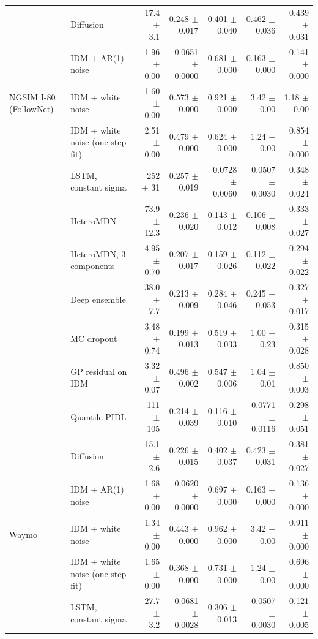\begin{longtable}{llrrrrr}
 & Diffusion & 17.4 $\pm$ 3.1 & 0.248 $\pm$ 0.017 & 0.401 $\pm$ 0.040 & 0.462 $\pm$ 0.036 & 0.439 $\pm$ 0.031 \\
 & IDM + AR(1) noise & 1.96 $\pm$ 0.00 & 0.0651 $\pm$ 0.0000 & 0.681 $\pm$ 0.000 & 0.163 $\pm$ 0.000 & 0.141 $\pm$ 0.000 \\
\midrule
NGSIM I-80 (FollowNet) & IDM + white noise & 1.60 $\pm$ 0.00 & 0.573 $\pm$ 0.000 & 0.921 $\pm$ 0.000 & 3.42 $\pm$ 0.00 & 1.18 $\pm$ 0.00 \\
 & IDM + white noise (one-step fit) & 2.51 $\pm$ 0.00 & 0.479 $\pm$ 0.000 & 0.624 $\pm$ 0.000 & 1.24 $\pm$ 0.00 & 0.854 $\pm$ 0.000 \\
 & LSTM, constant sigma & 252 $\pm$ 31 & 0.257 $\pm$ 0.019 & 0.0728 $\pm$ 0.0060 & 0.0507 $\pm$ 0.0030 & 0.348 $\pm$ 0.024 \\
 & HeteroMDN & 73.9 $\pm$ 12.3 & 0.236 $\pm$ 0.020 & 0.143 $\pm$ 0.012 & 0.106 $\pm$ 0.008 & 0.333 $\pm$ 0.027 \\
 & HeteroMDN, 3 components & 4.95 $\pm$ 0.70 & 0.207 $\pm$ 0.017 & 0.159 $\pm$ 0.026 & 0.112 $\pm$ 0.022 & 0.294 $\pm$ 0.022 \\
 & Deep ensemble & 38.0 $\pm$ 7.7 & 0.213 $\pm$ 0.009 & 0.284 $\pm$ 0.046 & 0.245 $\pm$ 0.053 & 0.327 $\pm$ 0.017 \\
 & MC dropout & 3.48 $\pm$ 0.74 & 0.199 $\pm$ 0.013 & 0.519 $\pm$ 0.033 & 1.00 $\pm$ 0.23 & 0.315 $\pm$ 0.028 \\
 & GP residual on IDM & 3.32 $\pm$ 0.07 & 0.496 $\pm$ 0.002 & 0.547 $\pm$ 0.006 & 1.04 $\pm$ 0.01 & 0.850 $\pm$ 0.003 \\
 & Quantile PIDL & 111 $\pm$ 105 & 0.214 $\pm$ 0.039 & 0.116 $\pm$ 0.010 & 0.0771 $\pm$ 0.0116 & 0.298 $\pm$ 0.051 \\
 & Diffusion & 15.1 $\pm$ 2.6 & 0.226 $\pm$ 0.015 & 0.402 $\pm$ 0.037 & 0.423 $\pm$ 0.031 & 0.381 $\pm$ 0.027 \\
 & IDM + AR(1) noise & 1.68 $\pm$ 0.00 & 0.0620 $\pm$ 0.0000 & 0.697 $\pm$ 0.000 & 0.163 $\pm$ 0.000 & 0.136 $\pm$ 0.000 \\
\midrule
Waymo & IDM + white noise & 1.34 $\pm$ 0.00 & 0.443 $\pm$ 0.000 & 0.962 $\pm$ 0.000 & 3.42 $\pm$ 0.00 & 0.911 $\pm$ 0.000 \\
 & IDM + white noise (one-step fit) & 1.65 $\pm$ 0.00 & 0.368 $\pm$ 0.000 & 0.731 $\pm$ 0.000 & 1.24 $\pm$ 0.00 & 0.696 $\pm$ 0.000 \\
 & LSTM, constant sigma & 27.7 $\pm$ 3.2 & 0.0681 $\pm$ 0.0028 & 0.306 $\pm$ 0.013 & 0.0507 $\pm$ 0.0030 & 0.121 $\pm$ 0.005 \\

\end{longtable}

